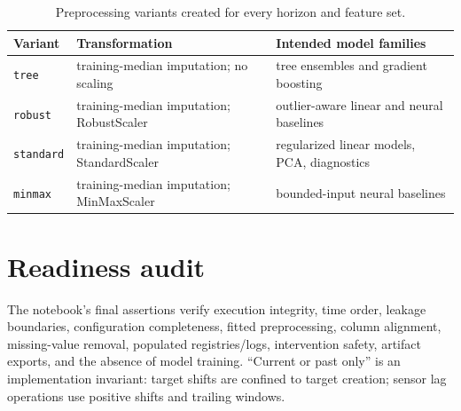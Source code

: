 \documentclass[10pt,a4paper]{article}
\begin{document}
\begin{table}[H]
\centering
\small
\begin{tabular}{p{}p{}p{}}
\toprule
Variant & Transformation & Intended model families \\
\midrule
\nolinkurl{tree} & training-median imputation; no scaling & tree ensembles and gradient boosting \\
\nolinkurl{robust} & training-median imputation; RobustScaler & outlier-aware linear and neural baselines \\
\nolinkurl{standard} & training-median imputation; StandardScaler & regularized linear models, PCA, diagnostics \\
\nolinkurl{minmax} & training-median imputation; MinMaxScaler & bounded-input neural baselines \\
\bottomrule
\end{tabular}
\caption{Preprocessing variants created for every horizon and feature set.}
\end{table}


\section{Readiness audit}
The notebook's final assertions verify execution integrity, time order, leakage boundaries, configuration completeness, fitted preprocessing, column alignment, missing-value removal, populated registries/logs, intervention safety, artifact exports, and the absence of model training. ``Current or past only'' is an implementation invariant: target shifts are confined to target creation; sensor lag operations use positive shifts and trailing windows.
\end{document}

